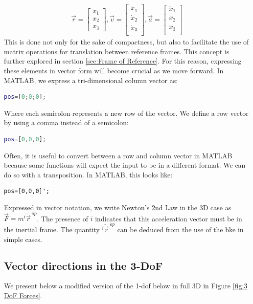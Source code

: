 \documentclass[12pt]{report}
\begin{document}
\begin{gather}
    \vec{r}=\begin{bmatrix}
        x_1\\
        x_2\\
        x_3
    \end{bmatrix},
    \vec{v}=\begin{bmatrix}
        \dot{x}_1\\
        \dot{x}_2\\
        \dot{x}_3\\
    \end{bmatrix},
        \vec{a}=\begin{bmatrix}
        \ddot{x}_1\\
        \ddot{x}_2\\
        \ddot{x}_3\\
    \end{bmatrix}
\end{gather}
This is done not only for the sake of compactness, but also to facilitate the use of matrix operations for translation between reference frames. This concept is further explored in section \ref{sec:Frame of Reference}. For this reason, expressing these elements in vector form will become crucial as we move forward. In MATLAB, we express a tri-dimensional column vector as:
\begin{lstlisting}[language=Matlab]
pos=[0;0;0];
\end{lstlisting}
Where each semicolon represents a new row of the vector. We define a row vector by using a comma instead of a semicolon: 
\begin{lstlisting}[language=Matlab]
pos=[0,0,0];
\end{lstlisting}
Often, it is useful to convert between a row and column vector in MATLAB because some functions will expect the input to be in a different format. We can do so with a transposition. In MATLAB, this looks like: 
\begin{lstlisting}
pos=[0,0,0]';
\end{lstlisting}
Expressed in vector notation, we write Newton's 2nd Law in the 3D case as $\vec{F}=m{}^i\ddot{\vec{r}}^{\ op}$. The presence of $i$ indicates that this acceleration vector must be in the inertial frame. The quantity ${}^i\ddot{\vec{r}}^{\ op}$ can be deduced from the use of the \gls{bke} in simple cases.

\subsection{Vector directions in the 3-DoF}\label{sec: vector directions in the 3DoF}
We present below a modified version of the 1-\gls{dof} below in full 3D in Figure \ref{fig:3 DoF Forces}.
\end{document}
